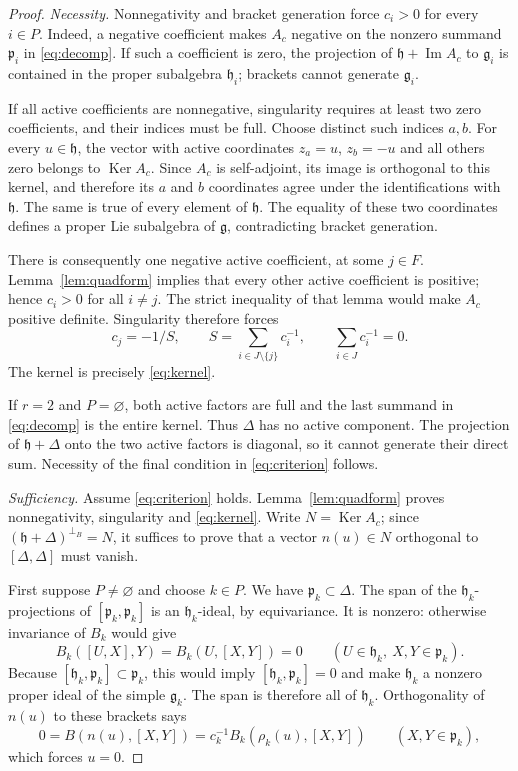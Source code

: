 \documentclass[12pt]{amsart}
\theoremstyle{plain}
\theoremstyle{definition}
\theoremstyle{remark}
\newcommand{\alg}[1]{\mathfrak{#1}}
\newcommand{\Ker}{\operatorname{Ker}}
\newcommand{\imd}{\operatorname{Im}}
\begin{document}
\begin{proof}
\emph{Necessity.} Nonnegativity and bracket generation force $c_i>0$ for every $i\in P$. Indeed, a
negative coefficient makes $A_c$ negative on the nonzero summand $\alg{p}_i$ in
\eqref{eq:decomp}. If such a coefficient is zero, the projection of $\alg{h}+\imd A_c$ to
$\alg{g}_i$ is contained in the proper subalgebra $\alg{h}_i$; brackets cannot generate
$\alg{g}_i$.

If all active coefficients are nonnegative, singularity requires at least two zero coefficients,
and their indices must be full. Choose distinct such indices $a,b$. For every $u\in\alg{h}$, the
vector with active coordinates $z_a=u$, $z_b=-u$ and all others zero belongs to $\Ker A_c$. Since
$A_c$ is self-adjoint, its image is orthogonal to this kernel, and therefore its $a$ and $b$
coordinates agree under the identifications with $\alg{h}$. The same is true of every element of
$\alg{h}$. The equality of these two coordinates defines a proper Lie subalgebra of $\alg{g}$,
contradicting bracket generation.

There is consequently one negative active coefficient, at some $j\in F$. Lemma~\ref{lem:quadform}
implies that every other active coefficient is positive; hence $c_i>0$ for all $i\neq j$. The
strict inequality of that lemma would make $A_c$ positive definite. Singularity therefore forces
\[ c_j=-1/S,\qquad S=\sum_{i\in J\setminus\{j\}}c_i^{-1},\qquad \sum_{i\in J}c_i^{-1}=0. \]
The kernel is precisely \eqref{eq:kernel}.

If $r=2$ and $P=\varnothing$, both active factors are full and the last summand in
\eqref{eq:decomp} is the entire kernel. Thus $\Delta$ has no active component. The projection of
$\alg{h}+\Delta$ onto the two active factors is diagonal, so it cannot generate their direct sum.
Necessity of the final condition in \eqref{eq:criterion} follows.

\emph{Sufficiency.} Assume \eqref{eq:criterion} holds. Lemma~\ref{lem:quadform} proves
nonnegativity, singularity and \eqref{eq:kernel}. Write $N=\Ker A_c$; since
$(\alg{h}+\Delta)^{\perp_B}=N$, it suffices to prove that a vector $n(u)\in N$ orthogonal to
$[\Delta,\Delta]$ must vanish.

First suppose $P\neq\varnothing$ and choose $k\in P$. We have $\alg{p}_k\subset\Delta$. The span
of the $\alg{h}_k$-projections of $[\alg{p}_k,\alg{p}_k]$ is an $\alg{h}_k$-ideal, by equivariance.
It is nonzero: otherwise invariance of $B_k$ would give
\[ B_k([U,X],Y)=B_k(U,[X,Y])=0\qquad(U\in\alg{h}_k,\ X,Y\in\alg{p}_k). \]
Because $[\alg{h}_k,\alg{p}_k]\subset\alg{p}_k$, this would imply $[\alg{h}_k,\alg{p}_k]=0$ and
make $\alg{h}_k$ a nonzero proper ideal of the simple $\alg{g}_k$. The span is therefore all of
$\alg{h}_k$. Orthogonality of $n(u)$ to these brackets says
\[ 0=B(n(u),[X,Y])=c_k^{-1}B_k(\rho_k(u),[X,Y])\qquad(X,Y\in\alg{p}_k), \]
which forces $u=0$.


\end{proof}
\end{document}
